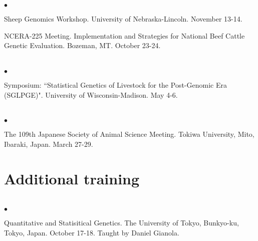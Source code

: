 \documentclass[margin,line,10pt]{res}
\newenvironment{list2}{
  \begin{list}{$\bullet$}{%
      \setlength{\itemsep}{0in}
      \setlength{\parsep}{0in} \setlength{\parskip}{0in}
      \setlength{\topsep}{0in} \setlength{\partopsep}{0in} 
      \setlength{\leftmargin}{0.2in}}}{\end{list}}
\begin{document}
\begin{resume}
\begin{list2}
\item Sheep Genomics Workshop. University of Nebraska-Lincoln. November 13-14.  

\vspace{0.5cm}

\item NCERA-225 Meeting. Implementation and Strategies for National Beef Cattle Genetic Evaluation. Bozeman, MT. October 23-24. 

\end{list2}  




\section{}
\begin{list2}
\item Symposium: ``Statistical Genetics of Livestock for the Post-Genomic Era (SGLPGE)". University of Wisconsin-Madison. May 4-6. 
\end{list2}  

\section{}
\begin{list2}
\item  The 109th Japanese Society of Animal Science Meeting. Tokiwa University, Mito, Ibaraki, Japan. March 27-29. 

\end{list2}













\vspace{0.5cm}
\section{ \sc Additional training}
\vspace{1cm}

\section{}
\begin{list2}

\item Quantitative and Statisitical Genetics. The University of Tokyo, Bunkyo-ku, Tokyo, Japan. October 17-18. Taught by Daniel Gianola.


\end{list2}
\end{resume}
\end{document}
